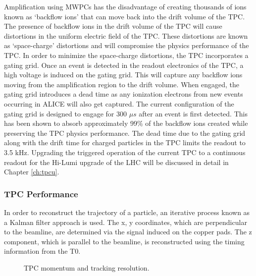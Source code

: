 Amplification using MWPCs has the disadvantage of creating thousands of ions known as `backflow ions' that can move back into the drift volume of the TPC.  The presence of backflow ions in the drift volume of the TPC will cause distortions in the uniform electric field of the TPC.  These distortions are known as `space-charge' distortions and will compromise the physics performance of the TPC.  In order to minimize the space-charge distortions, the TPC incorporates a gating grid\cite{Tangwancharoen:2016dqs}.  Once an event is detected in the readout electronics of the TPC, a high voltage is induced on the gating grid.  This will capture any backflow ions moving from the amplification region to the drift volume.  When engaged, the gating grid introduces a dead time as any ionization electrons from new events occurring in ALICE will also get captured.  The current configuration of the gating grid is designed to engage for 300 $\mu s$ after an event is first detected.  This has been shown to absorb approximately 99\% of the backflow ions created while preserving the TPC physics performance.  The dead time due to the gating grid along with the drift time for charged particles in the TPC limits the readout to 3.5 kHz.  Upgrading the triggered operation of the current TPC to a continuous readout for the Hi-Lumi upgrade of the LHC will be discussed in detail in Chapter \ref{ch:tpcu}.

\subsubsection{TPC Performance}\label{sec:tpcper}

In order to reconstruct the trajectory of a particle, an iterative process known as a Kalman filter approach is used.  The x, y coordinates, which are perpendicular to the beamline, are determined via the signal induced on the copper pads.  The z component, which is parallel to the beamline, is reconstructed using the timing information from the T0.  

\begin{figure}[b!]
   \centering
   \caption{TPC momentum and tracking resolution\cite{Abelev:2014ffa}.}
   \label{fig:multipart-TPC}
\end{figure}


